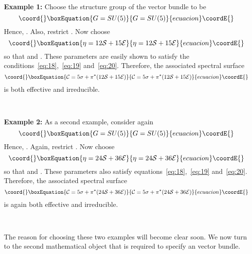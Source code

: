 \documentclass[a4paper,12pt]{article}
\numberwithin{equation}{section}
\def\cC{{\mathcal C}}
\def\cE{{\mathcal E}}
\def\cS{{\mathcal S}}
\theoremstyle{plain}
\begin{document}
\smallskip

\

\noindent
{\bf Example 1:}
Choose the structure group of the vector bundle to be
\begin{equation}\coord{}\boxEquation{
G=SU(5)
\label{eq:21}
}{
G=SU(5)
}{ecuacion}\coordE{}\end{equation}
Hence, \coordHE{}. Also, restrict \coordHE{}. Now choose
\begin{equation}\coord{}\boxEquation{
\eta= 12\cS+15\cE
\label{eq:22}
}{
\eta= 12\cS+15\cE
}{ecuacion}\coordE{}\end{equation}
so that \coordHE{} and \coordHE{}. These parameters are easily shown to satisfy
the conditions~\eqref{eq:18},~\eqref{eq:19} and~\eqref{eq:20}. Therefore,
the associated spectral surface 
\begin{equation}\coord{}\boxEquation{
\cC=5\sigma+ \pi^{*}(12\cS+15\cE)
\label{eq:23}
}{
\cC=5\sigma+ \pi^{*}(12\cS+15\cE)
}{ecuacion}\coordE{}\end{equation}
is both effective and irreducible. 


\smallskip

\

\noindent
{\bf Example 2:}
As a second example, consider again
\begin{equation}\coord{}\boxEquation{
G=SU(5)
\label{eq:24}
}{
G=SU(5)
}{ecuacion}\coordE{}\end{equation}
Hence, \coordHE{}. Again, restrict \coordHE{}. Now choose
\begin{equation}\coord{}\boxEquation{
\eta= 24\cS+36\cE
\label{eq:25}
}{
\eta= 24\cS+36\cE
}{ecuacion}\coordE{}\end{equation}
so that \coordHE{} and \coordHE{}. These parameters also satisfy
equations~\eqref{eq:18},~\eqref{eq:19} and~\eqref{eq:20}. Therefore,
the associated 
spectral surface
\begin{equation}\coord{}\boxEquation{
\cC=5\sigma+ \pi^{*}(24\cS+36\cE)
\label{eq:26}
}{
\cC=5\sigma+ \pi^{*}(24\cS+36\cE)
}{ecuacion}\coordE{}\end{equation}
is again both effective and irreducible. 


\smallskip

\

The reason for choosing
these two examples will become clear soon. We now turn to the second
mathematical object that is required to specify an \coordHE{} vector bundle.
\end{document}
